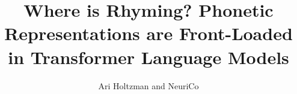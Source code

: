\documentclass{article}
\title{Where is Rhyming? Phonetic Representations are Front-Loaded in Transformer Language Models}
\author{Ari Holtzman and NeuriCo}
\begin{document}
\maketitle

\begin{abstract}

\end{abstract}










\end{document}
